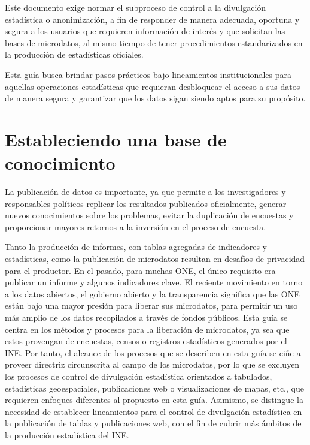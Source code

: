 \documentclass[
]{book}
\theoremstyle{definition}
\theoremstyle{definition}
\theoremstyle{definition}
\theoremstyle{definition}
\theoremstyle{remark}
\begin{document}
Este documento exige normar el subproceso de control a la divulgación estadística o anonimización, a fin de responder de manera adecuada, oportuna y segura a los usuarios que requieren información de interés y que solicitan las bases de microdatos, al mismo tiempo de tener procedimientos estandarizados en la producción de estadísticas oficiales.

Esta guía busca brindar pasos prácticos bajo lineamientos institucionales para aquellas operaciones estadísticas que requieran desbloquear el acceso a sus datos de manera segura y garantizar que los datos sigan siendo aptos para su propósito.

\hypertarget{estableciendo-una-base-de-conocimiento}{%
\section{Estableciendo una base de conocimiento}\label{estableciendo-una-base-de-conocimiento}}

La publicación de datos es importante, ya que permite a los investigadores y responsables políticos replicar los resultados publicados oficialmente, generar nuevos conocimientos sobre los problemas, evitar la duplicación de encuestas y proporcionar mayores retornos a la inversión en el proceso de encuesta.

Tanto la producción de informes, con tablas agregadas de indicadores y estadísticas, como la publicación de microdatos resultan en desafíos de privacidad para el productor. En el pasado, para muchas ONE, el único requisito era publicar un informe y algunos indicadores clave. El reciente movimiento en torno a los datos abiertos, el gobierno abierto y la transparencia significa que las ONE están bajo una mayor presión para liberar sus microdatos, para permitir un uso más amplio de los datos recopilados a través de fondos públicos. Esta guía se centra en los métodos y procesos para la liberación de microdatos, ya sea que estos provengan de encuestas, censos o registros estadísticos generados por el INE. Por tanto, el alcance de los procesos que se describen en esta guía se ciñe a proveer directriz circunscrita al campo de los microdatos, por lo que se excluyen los procesos de control de divulgación estadística orientados a tabulados, estadísticas geoespaciales, publicaciones web o visualizaciones de mapas, etc., que requieren enfoques diferentes al propuesto en esta guía. Asimismo, se distingue la necesidad de establecer lineamientos para el control de divulgación estadística en la publicación de tablas y publicaciones web, con el fin de cubrir más ámbitos de la producción estadística del INE.
\end{document}
